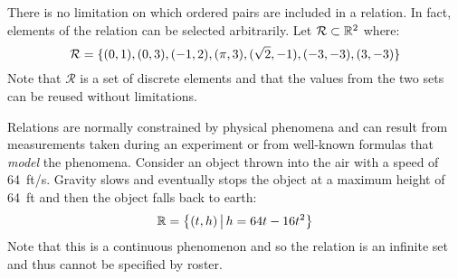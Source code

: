 \documentclass[letterpaper,12pt,fleqn]{article}
\newcommand{\Rel}{\mathcal{R}}
\begin{document}
\begin{example}
  There is no limitation on which ordered pairs are included in a relation.  In fact, elements of the relation can
  be selected arbitrarily.  Let \(\Rel\subset\R^2\) where:
  \[\Rel=\set{(0,1), (0,3), (-1,2), (\pi,3), (\sqrt{2},-1),(-3,-3),(3,-3)}\]
  Note that \(\Rel\) is a set of discrete elements and that the values from the two sets can be reused without
  limitations.

  \begin{center}
  \end{center}
\end{example}

\begin{example}
  Relations are normally constrained by physical phenomena and can result from measurements taken during an
  experiment or from well-known formulas that \emph{model} the phenomena.  Consider an object thrown into the air
  with a speed of \SI{64}{ft/s}.  Gravity slows and eventually stops the object at a maximum height of \SI{64}{ft}
  and then the object falls back to earth:
  \[\mathbb{R}=\left\{{(t,h)}\,\middle|\,{h=64t-16t^2}\right\}\]
  Note that this is a continuous phenomenon and so the relation is an infinite set and thus cannot be specified by
  roster.

  \begin{center}
  \end{center}
\end{example}
\end{document}
